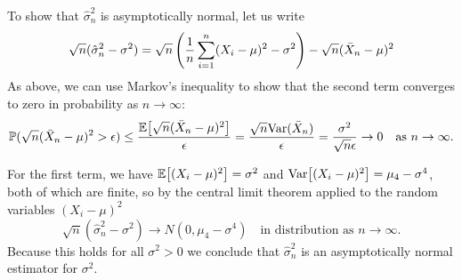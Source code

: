 \begin{exercise}
\begin{questions}
\begin{parts}
\begin{answer}
To show that $\hat{\sigma}^2_n$ is asymptotically normal, let us write
\[
\sqrt{n}(\hat{\sigma}^2_n -\sigma^2)
	= \sqrt{n}\left(\frac{1}{n}\sum_{i=1}^n(X_i-\mu)^2 -\sigma^2\right) - \sqrt{n}(\bar{X}_n-\mu)^2
\]
As above, we can use Markov's inequality to show that the second term converges to zero in probability as $n\to\infty$: 
\begin{align*}
\mathbb{P}(\sqrt{n}(\bar{X}_n-\mu)^2>\epsilon)
	\leq 	\frac{\mathbb{E}\big[\sqrt{n}(\bar{X}_n-\mu)^2\big]}{\epsilon} 
	=		\frac{\sqrt{n}\text{Var}(\bar{X}_n)}{\epsilon}
	=		\frac{\sigma^2}{\sqrt{n}\epsilon}
	\to 0 \quad\text{as $n\to\infty$.}
\end{align*}

For the first term, we have $\mathbb{E}\big[(X_i-\mu)^2\big]=\sigma^2$ and $\text{Var}\big[(X_i-\mu)^2\big]=\mu_4-\sigma^4$, both of which are finite, so by the central limit theorem applied to the random variables $(X_i-\mu)^2$
\[
\sqrt{n}(\hat{\sigma}^2_n -\sigma^2)
	\to N(0, \mu_4 - \sigma^4) \quad\text{in distribution as $n\to\infty$.}
\]
Because this holds for all $\sigma^2>0$ we conclude that $\hat{\sigma}^2_n$ is an asymptotically normal estimator for $\sigma^2$.
\end{answer}
\end{parts}

\end{questions}
\end{exercise}


